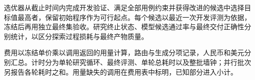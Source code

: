 选优器从截止时间内完成开发验证、满足全部用例约束并获得改进的候选中选择目标值最高者，保留初始程序作为可行起点。每个候选以最近一次开发评测为依据，冻结后再用独立最终集验收。研究终止状态、模型候选通过率与最终交付正确性分别统计，以区分探索过程损耗与最终产物质量。

费用以冻结单价乘以调用返回的用量计算，路由与生成分项记录，人民币和美元分别汇总。计时分为单轮研究循环、最终评测、单轮总耗时以及整批墙钟；并行批次另报告各轮耗时之和。用量缺失的调用在费用表中标明，已知部分进入小计。

